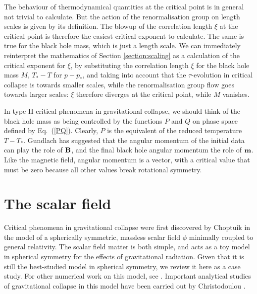 \documentclass{article}
\begin{document}
The behaviour of thermodynamical quantities at the critical point is in
general not trivial to calculate. But the action of the
renormalisation group on length scales is given by its definition. The
blowup of the correlation length $\xi$ at the critical point is
therefore the easiest critical exponent to calculate. The same is true
for the black hole mass, which is just a length scale. We can
immediately reinterpret the mathematics of Section
\ref{section:scaling} as a calculation of the critical exponent for
$\xi$, by substituting the correlation length $\xi$ for the black hole
mass $M$, $T_*-T$ for $p-p_*$, and taking into account that the
$\tau$-evolution in critical collapse is towards smaller scales, while
the renormalisation group flow goes towards larger scales: $\xi$
therefore diverges at the critical point, while $M$ vanishes.

In type II critical phenomena in gravitational collapse, we should
think of the black hole mass as being controlled by the functions $P$
and $Q$ on phase space defined by Eq.~(\ref{PQ}). Clearly, $P$ is the
equivalent of the reduced temperature $T-T_*$. Gundlach
\cite{Gundlach_scalingfunctions} has suggested that the angular
momentum of the initial data can play the role of ${\bf B}$, and the
final black hole angular momentum the role of ${\bf m}$. Like the
magnetic field, angular momentum is a vector, with a critical value
that must be zero because all other values break rotational symmetry.


\section{The scalar field}
\label{section:scalarfield}

Critical phenomena in gravitational collapse were first discovered by
Choptuik \cite{Choptuik91, Choptuik92, Choptuik94} in the model of a
spherically symmetric, massless scalar field $\phi$ minimally coupled to
general relativity. The scalar field matter is both simple, and acts
as a toy model in spherical symmetry for the effects of gravitational
radiation. 
Given that it is still the best-studied model
in spherical symmetry, we review it here as a case study. For other
numerical work on this model, see \cite{GPP2, Garfinkle,
HamadeStewart, FrolovPen, Puerrer}. Important analytical studies of
gravitational collapse in this model have been carried out by
Christodoulou \cite{Christodoulou0, Christodoulou0a, Christodoulou1,
Christodoulou2, Christodoulou3, Christodoulou4, Christodoulou5}.
\end{document}
